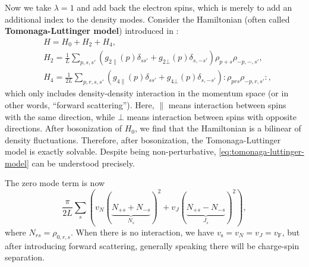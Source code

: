 \documentclass[hyperref, a4paper]{article}
\newcommand*{\normalorder}[1]{: #1 :}
\newcommand*{\concept}[1]{{\textbf{#1}}}
\begin{document}
Now we take $\lambda = 1$ and add back the electron spins, which is merely to add an additional index to the density modes.
Consider the Hamiltonian (often called \concept{Tomonaga-Luttinger model}) introduced in \cite{onedfermi1995}:
\begin{equation}
    \begin{aligned}
        & H = H_0 + H_2 + H_4,  \\
        & H_2 = \frac{1}{L} \sum_{p, s, s'} \left( g_{2 \parallel} (p) \delta_{s s'} + g_{2 \bot }(p) \delta_{s, -s'} \right) \rho_{p + s} \rho_{-p, -, s'}, \\
        & H_4 = \frac{1}{2L} \sum_{p, r, s, s'} \left( g_{4 \parallel} (p) \delta_{s s'} + g_{4 \bot }(p) \delta_{s, -s'} \right) \normalorder{\rho_{p r s} \rho_{-p, r, s'}},
    \end{aligned}
    \label{eq:tomonaga-luttinger-model}
\end{equation} 
which only includes density-density interaction in the momentum space (or in other words, ``forward scattering'').
Here, $\parallel$ means interaction between spins with the same direction, while $\bot$ means interaction between spins with opposite directions.
After bosonization of $H_0$, we find that the Hamiltonian is a bilinear of density fluctuations.
Therefore, after bosonization, the Tomonaga-Luttinger model is exactly solvable.
Despite being non-perturbative, \eqref{eq:tomonaga-luttinger-model} can be understood precisely.

The zero mode term is now 
\begin{equation}
    \frac{\pi}{2L} \sum_s (v_N (\underbrace{N_{+ s} + N_{-s}}_{N_s})^2  + v_{J} (\underbrace{N_{+s} - N_{-s}}_{J_s})^2 ),
\end{equation}
where $N_{rs} = \rho_{0, r, s}$. When there is no interaction, we have $v_\text{s} = v_N = v_J = v_\text{F}$, but after 
introducing forward scattering, generally speaking there will be charge-spin separation.
\end{document}
